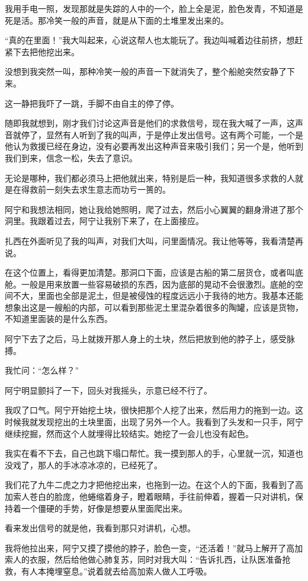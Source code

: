 我用手电一照，发现那就是失踪的人中的一个，脸上全是泥，脸色发青，不知道是死是活。那冷笑一般的声音，就是从下面的土堆里发出来的。

“真的在里面！”我大叫起来，心说这帮人也太能玩了。我边叫喊着边往前挤，想赶紧下去把他挖出来。

没想到我突然一叫，那种冷笑一般的声音一下就消失了，整个船舱突然安静了下来。

这一静把我吓了一跳，手脚不由自主的停了停。

随即我就想到，刚才我们讨论这声音是他们的求救信号，现在我大喊了一声，这声音就停了，显然有人听到了我的叫声，于是停止发出信号。这有两个可能，一个是他认为救援已经在身边，没有必要再发出这种声音来吸引我们；另一个是，他听到我们到来，信念一松，失去了意识。

无论是哪种，我们都必须马上把他就出来，特别是后一种，我知道很多求救的人就是在得救前一刻失去求生意志而功亏一篑的。

阿宁和我想法相同，她让我给她照明，爬了过去，然后小心翼翼的翻身滑进了那个洞里。我跟着过去，阿宁让我别下来了，在上面接应。

扎西在外面听见了我的叫声，对我们大叫，问里面情况。我让他等等，我看清楚再说。

在这个位置上，看得更加清楚。那洞口下面，应该是古船的第二层货仓，或者叫底舱。一般是用来放置一些容易破损的东西，因为底部的晃动不会很激烈。底舱的空间不大，里面也全部是泥土，但是被侵蚀的程度远远小于我待的地方。我基本还能想象出这是一艘船的内部，可以看到那些泥土里混杂着很多的陶罐，应该是货物，不知道里面装的是什么东西。

阿宁下去了之后，马上就拨开那人身上的土块，然后把放到他的脖子上，感受脉搏。

我忙问：“怎么样？”

阿宁明显颤抖了一下，回头对我摇头，示意已经不行了。

我叹了口气。阿宁开始挖土块，很快把那个人挖了出来，然后用力的拖到一边。这时候我就发现挖出的土块里面，出现了另外一个人。我看到了头发和一只手，阿宁继续挖掘，然而这个人就埋得比较结实。她挖了一会儿也没有起色。

我实在看不下去，自己也跳下塌口帮忙。我一摸到那人的手，心里就一沉，知道也没戏了，那人的手冰凉冰凉的，已经死了。

我们花了九牛二虎之力才把他挖出来，也拖到一边。在这个人的下面，我看到了高加索人苍白的脸庞，他蜷缩着身子，瞪着眼睛，手往前伸着，握着一只对讲机，保持着一个僵硬的手势，好像是想要从里面爬出来。

看来发出信号的就是他，我看到那只对讲机，心想。

我将他拉出来，阿宁又摸了摸他的脖子，脸色一变，“还活着！”就马上解开了高加索人的衣服，然后给他做心肺复苏，同时对我大叫：“告诉扎西，让队医准备抢救，有人本掩埋窒息。”说着就去给高加索人做人工呼吸。

